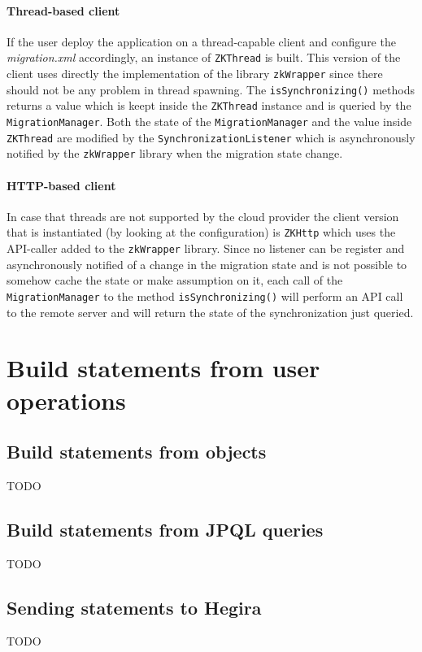\paragraph{Thread-based client} If the user deploy the application on a thread-capable client and configure the \textit{migration.xml} accordingly, an instance of \texttt{ZKThread} is built. This version of the client uses directly the implementation of the library \texttt{zkWrapper} since there should not be any problem in thread spawning.
The \texttt{isSynchronizing()} methods returns a value which is keept inside the \texttt{ZKThread} instance and is queried by the \texttt{MigrationManager}.
Both the state of the \texttt{MigrationManager} and the value inside \texttt{ZKThread} are modified by the \texttt{SynchronizationListener} which is asynchronously notified by the \texttt{zkWrapper} library when the migration state change.

\paragraph{HTTP-based client} In case that threads are not supported by the cloud provider the client version that is instantiated (by looking at the configuration) is \texttt{ZKHttp} which uses the API-caller added to the \texttt{zkWrapper} library.
Since no listener can be register and asynchronously notified of a change in the migration state and is not possible to somehow cache the state or make assumption on it, each call of the \texttt{MigrationManager} to the method \texttt{isSynchronizing()} will perform an API call to the remote server and will return the state of the synchronization just queried.

\section{Build statements from user operations}
\label{sec:statements}
\subsection{Build statements from objects}
TODO
\subsection{Build statements from JPQL queries}
TODO
\subsection{Sending statements to Hegira}
TODO

